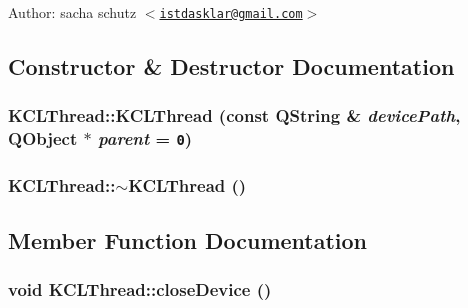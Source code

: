 \begin{Desc}
\item[Author:]sacha schutz $<$\href{mailto:istdasklar@gmail.com}{\tt istdasklar@gmail.com}$>$ \end{Desc}


\subsection{Constructor \& Destructor Documentation}
\hypertarget{class_k_c_l_thread_155436758518dcf6eeebc4f1be3e5367}{
\subsubsection[{KCLThread}]{\setlength{\rightskip}{0pt plus 5cm}KCLThread::KCLThread (const QString \& {\em devicePath}, \/  QObject $\ast$ {\em parent} = {\tt 0})}}
\label{class_k_c_l_thread_155436758518dcf6eeebc4f1be3e5367}


\hypertarget{class_k_c_l_thread_346cf94ab107d40c2b39d41ff5de6f89}{
\subsubsection[{$\sim$KCLThread}]{\setlength{\rightskip}{0pt plus 5cm}KCLThread::$\sim$KCLThread ()}}
\label{class_k_c_l_thread_346cf94ab107d40c2b39d41ff5de6f89}




\subsection{Member Function Documentation}
\hypertarget{class_k_c_l_thread_dc58b5a20a35371ecf539c51098411c6}{
\subsubsection[{closeDevice}]{\setlength{\rightskip}{0pt plus 5cm}void KCLThread::closeDevice ()}}
\label{class_k_c_l_thread_dc58b5a20a35371ecf539c51098411c6}


